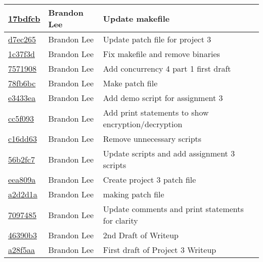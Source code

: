 \documentclass[letterpaper,10pt,titlepage]{article}
\begin{document}
\begin{tabular}{l l l}
\href{https://github.com/brandonlee503/Operating-Systems-II/commit/17bdfcbb718028296d431ccebebbc6c685130715}{17bdfcb} & Brandon Lee & Update makefile\\\hline
\href{https://github.com/brandonlee503/Operating-Systems-II/commit/d7ec26518c609d6cb39eb3cb817e67cb4d6c086c}{d7ec265} & Brandon Lee & Update patch file for project 3\\\hline
\href{https://github.com/brandonlee503/Operating-Systems-II/commit/1c37f3db2deaca98fb48a2bb170b76a71501f0b6}{1c37f3d} & Brandon Lee & Fix makefile and remove binaries\\\hline
\href{https://github.com/brandonlee503/Operating-Systems-II/commit/75719080678f7a720d35014acdfc906398a54654}{7571908} & Brandon Lee & Add concurrency 4 part 1 first draft\\\hline
\href{https://github.com/brandonlee503/Operating-Systems-II/commit/78fb6bc58f966692a9debecd343e42d427306a20}{78fb6bc} & Brandon Lee & Make patch file\\\hline
\href{https://github.com/brandonlee503/Operating-Systems-II/commit/e3433eabeefea7cd250094f74ac63830b8f25a9b}{e3433ea} & Brandon Lee & Add demo script for assignment 3\\\hline
\href{https://github.com/brandonlee503/Operating-Systems-II/commit/cc5f093dedd1119bdf07ed92aba96380446121a3}{cc5f093} & Brandon Lee & Add print statements to show encryption/decryption\\\hline
\href{https://github.com/brandonlee503/Operating-Systems-II/commit/c16dd63ec5361645175d76154b32233fbcf5c3a7}{c16dd63} & Brandon Lee & Remove unnecessary scripts\\\hline
\href{https://github.com/brandonlee503/Operating-Systems-II/commit/56b2fc718afcdc661b2760a9b37dea7ac9a69474}{56b2fc7} & Brandon Lee & Update scripts and add assignment 3 scripts\\\hline
\href{https://github.com/brandonlee503/Operating-Systems-II/commit/eea809aa39ede2088b25e04c4ff7c30790066aba}{eea809a} & Brandon Lee & Create project 3 patch file\\\hline
\href{https://github.com/brandonlee503/Operating-Systems-II/commit/a2d2d1a1e265caa2c947b9d1fca616ce0bb921b2}{a2d2d1a} & Brandon Lee & making patch file\\\hline
\href{https://github.com/brandonlee503/Operating-Systems-II/commit/70974857a253c865b13f408d6d1d5313222b1f95}{7097485} & Brandon Lee & Update comments and print statements for clarity\\\hline
\href{https://github.com/brandonlee503/Operating-Systems-II/commit/46390b30cb13ff0b416c6133608383fa15f006d3}{46390b3} & Brandon Lee & 2nd Draft of Writeup\\\hline
\href{https://github.com/brandonlee503/Operating-Systems-II/commit/a28f5aadad3d99edd90c21e5e4d2a08a9599107f}{a28f5aa} & Brandon Lee & First draft of Project 3 Writeup\\\hline
\end{tabular}
\end{document}
